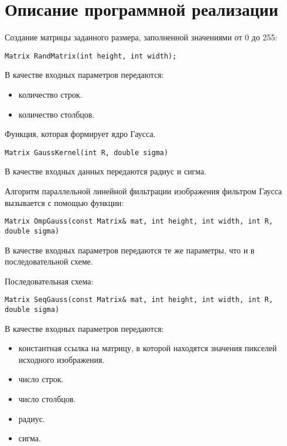 \documentclass{report}
\begin{document}
\section*{Описание программной реализации}
Создание матрицы заданного размера, заполненной значениями от 0 до 255:
\begin{lstlisting}
Matrix RandMatrix(int height, int width);
\end{lstlisting}
\par В качестве входных параметров передаются:
\begin{itemize}
\item количество строк.
\item количество столбцов.
\end{itemize}
\par Функция, которая формирует ядро Гаусса.
\begin{lstlisting}
Matrix GaussKernel(int R, double sigma)
\end{lstlisting}
\par В качестве входных данных передаются радиус и сигма.
\par Алгоритм параллельной линейной фильтрации изображения фильтром Гаусса вызывается с помощью функции:
\begin{lstlisting}
Matrix OmpGauss(const Matrix& mat, int height, int width, int R, double sigma)
\end{lstlisting}
\par В качестве входных параметров передаются те же параметры, что и в последовательной схеме.
\par Последовательная схема:
\begin{lstlisting}
Matrix SeqGauss(const Matrix& mat, int height, int width, int R, double sigma)
\end{lstlisting}
\par В качестве входных параметров передаются:
\begin{itemize}
\item константная ссылка на матрицу, в которой находятся значения пикселей исходного изображения.
\item число строк.
\item число столбцов.
\item радиус.
\item сигма.
\end{itemize}
\newpage

\end{document}
